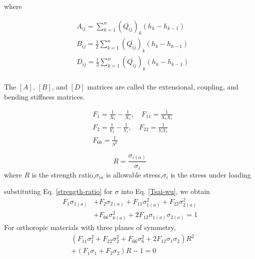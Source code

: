\documentclass[smallextended]{svjour3}       %
\begin{document}
where

\begin{equation}
    \begin{split}
    &A_{ij}
	=
	\sum_{k=1}^n(\overline{Q_{ij}})_k(h_k-h_{k-1}) \\
    &B_{ij}
	=
	\frac{1}{2}\sum_{k=1}^n(\overline{Q_{ij}})_k(h_k-h_{k-1}) \\
    &D_{ij}
	=
	\frac{1}{3}\sum_{k=1}^n(\overline{Q_{ij}})_k(h_k-h_{k-1}) \\
    \end{split}
\end{equation}

The $[A]$, $[B]$, and $[D]$ matrices are called the extensional, coupling, and bending stiffness
matrices.

\begin{equation}
    \begin{split}
    &F_{1}=\frac{1}{X_t}-\frac{1}{X_c},\quad  F_{11}=\frac{1}{X_tX_c} \\
    &F_{2}=\frac{1}{Y_t}-\frac{1}{Y_c},\quad  F_{22}=\frac{1}{Y_tY_c} \\
    &F_{66}=\frac{1}{S^2}
   \end{split}
\end{equation}

\begin{equation*}\label{strength-ratio}
    R=\frac{\sigma_{i(\alpha)}}{\sigma_i}
\end{equation*}
where $R$ is the strength ratio,$\sigma_{i{a}}$ is allowable stress,$\sigma_i$ is the stress under loading

substituting Eq.  \ref{strength-ratio} for $\sigma$ into Eq. \ref{Tsai-wu}, we obtain
\begin{equation*}
	\begin{split}
		F_1\sigma_{1(a)}&+F_2\sigma_{2(a)}+F_{11}\sigma_{1(a)}^2+F_{22}\sigma_{2(a)}^2 \\
						&+F_{66}\sigma_{6(a)}^2+2F_{12}\sigma_{1(a)}\sigma_{2(a)}=1
    \end{split}
\end{equation*}
For orthoropic materials with three planes of symmetry, 
\begin{equation*}\label{Tsai-wu}
	\begin{split}
		&(F_{11}\sigma_1^2+F_{22}\sigma_2^2+F_{66}\sigma_6^2+2F_{12}\sigma_1\sigma_2)R^2 \\
		&+(F_1\sigma_1+F_2\sigma_2)R-1=0 
    \end{split}
\end{equation*}
\end{document}
